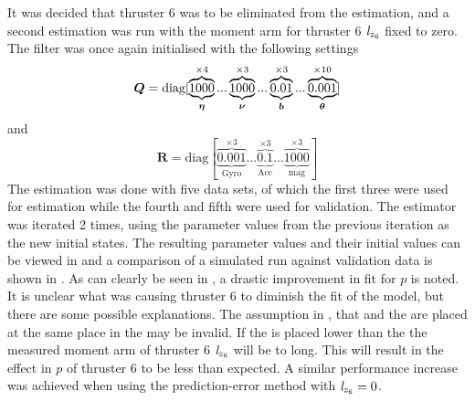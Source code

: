 It was decided that thruster 6 was to be eliminated from the estimation, and a second estimation was run with the moment arm for thruster 6 $\mathit{l}_{z_{6}}$ fixed to zero. The filter was once again initialised with the following settings
\begin{equation*}
\boldsymbol{Q}=\text{diag}[\underbrace{\overbrace{1000}^{\times4}}_{\boldsymbol{\eta}}... \underbrace{\overbrace{1000}^{\times3}}_{\boldsymbol{\nu}}...\underbrace{\overbrace{0.01}^{\times3}}_{\boldsymbol{b}}... \underbrace{\overbrace{0.001}^{\times10}}_{\boldsymbol{\theta}}]
\end{equation*}
and
\begin{equation*}
\boldsymbol{R} = \text{diag}[\underbrace{\overbrace{0.001}^{\times3}}_{\text{Gyro}}... \underbrace{\overbrace{0.1}^{\times3}}_{\text{Acc}}... \underbrace{\overbrace{1000}^{\times3}}_{\text{mag}}]
\end{equation*} 
The estimation was done with five data sets, of which the first three were used for estimation while the fourth and fifth were used for validation. The estimator was iterated 2 times, using the parameter values from the previous iteration as the new initial states. The resulting parameter values and their initial values can be viewed in  and a comparison of a simulated run against validation data is shown in . As can clearly be seen in , a drastic improvement in fit for $p$ is noted. It is unclear what was causing thruster 6 to diminish the fit of the model, but there are some possible explanations. The assumption in , that \abbrCG and the \abbrCO are placed at the same place in the \abbrROV may be invalid. If the \abbrCG is placed lower than the \abbrCO the measured moment arm of thruster 6 $\mathit{l}_{z_{6}}$ will be to long. This will result in the effect in $p$ of thruster 6 to be less than expected. A similar performance increase was achieved when using the prediction-error method with $\mathit{l}_{z_{6}}=0$.

